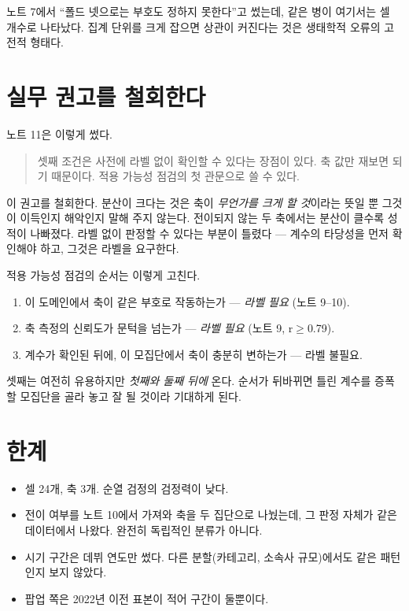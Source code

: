 \documentclass[10pt]{article}
\begin{document}
노트 7에서 ``폴드 넷으로는 부호도 정하지 못한다''고 썼는데, 같은 병이 여기서는
셀 개수로 나타났다. 집계 단위를 크게 잡으면 상관이 커진다는 것은 생태학적 오류의
고전적 형태다.


\section{실무 권고를 철회한다}

노트 11은 이렇게 썼다.

\begin{quote}\fontsize{9.2}{11}\selectfont
셋째 조건은 사전에 라벨 없이 확인할 수 있다는 장점이 있다. 축 값만 재보면 되기
때문이다. 적용 가능성 점검의 첫 관문으로 쓸 수 있다.
\end{quote}

이 권고를 철회한다. 분산이 크다는 것은 축이 \emph{무언가를 크게 할 것}이라는 뜻일 뿐
그것이 이득인지 해악인지 말해 주지 않는다. 전이되지 않는 두 축에서는 분산이 클수록
성적이 나빠졌다. 라벨 없이 판정할 수 있다는 부분이 틀렸다 --- 계수의 타당성을 먼저
확인해야 하고, 그것은 라벨을 요구한다.

적용 가능성 점검의 순서는 이렇게 고친다.

\begin{enumerate}[leftmargin=1.3em,itemsep=0.15em]
\item 이 도메인에서 축이 같은 부호로 작동하는가 --- \emph{라벨 필요} (노트 9--10).
\item 축 측정의 신뢰도가 문턱을 넘는가 --- \emph{라벨 필요} (노트 9, r$\geq$0.79).
\item 계수가 확인된 뒤에, 이 모집단에서 축이 충분히 변하는가 --- 라벨 불필요.
\end{enumerate}

셋째는 여전히 유용하지만 \emph{첫째와 둘째 뒤에} 온다. 순서가 뒤바뀌면 틀린 계수를
증폭할 모집단을 골라 놓고 잘 될 것이라 기대하게 된다.

\section{한계}

\begin{itemize}[leftmargin=1.1em,itemsep=0.15em]
\item 셀 24개, 축 3개. 순열 검정의 검정력이 낮다.
\item 전이 여부를 노트 10에서 가져와 축을 두 집단으로 나눴는데, 그 판정 자체가
      같은 데이터에서 나왔다. 완전히 독립적인 분류가 아니다.
\item 시기 구간은 데뷔 연도만 썼다. 다른 분할(카테고리, 소속사 규모)에서도
      같은 패턴인지 보지 않았다.
\item 팝업 쪽은 2022년 이전 표본이 적어 구간이 둘뿐이다.
\end{itemize}
\end{document}
